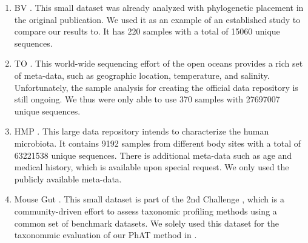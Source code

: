 \begin{enumerate}
    \item   \acf{BV} \cite{Srinivasan2012}.
            This small dataset was already analyzed with phylogenetic placement in the original publication.
            We used it as an example of an established study to compare our results to.
            It has \num{220} samples with a total of \num{15 060} unique sequences.
    \item   \acf{TO} \cite{Karsenti2011,Sunagawa2015,Guidi2016}.
            This world-wide sequencing effort of the open oceans provides a rich set of meta-data,
            such as geographic location, temperature, and salinity.
            Unfortunately, the sample analysis for creating the official data repository is still ongoing.
            We thus were only able to use \num{370} samples with \num{27 697 007} unique sequences.
    \item   \acf{HMP} \cite{Huttenhower2012,Methe2012}.
            This large data repository intends to characterize the human microbiota.
            It contains \num{9192} samples from different body sites with a total of \num{63 221 538} unique sequences.
            There is additional meta-data such as age and medical history, which is available upon special request.
            We only used the publicly available meta-data.
    \item   Mouse Gut \cite{Sczyrba2017,Bremges2018}.
            This small dataset is part of the 2nd  Challenge \cite{Bremges2018},
            which is a community-driven effort to assess taxonomic profiling methods using a common set of benchmark datasets.
            We solely used this dataset for the taxonommic evaluation of our \ac{PhAT} method in
            .
\end{enumerate}


